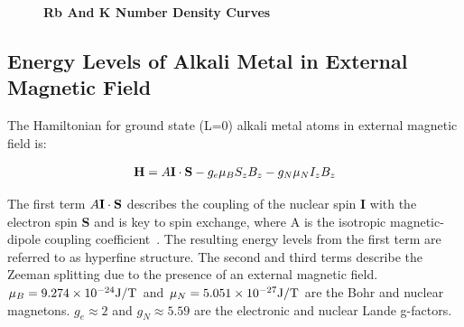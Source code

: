 \begin{figure}[t!]
	
	\centering
	\caption[Rb And K Number Density Curves]{{\bf Rb And K Number Density Curves}}
	\label{fig:AlkaliVaporDensity}
	
\end{figure}

\subsection{Energy Levels of Alkali Metal in External Magnetic Field}

The Hamiltonian for ground state (L=0) alkali metal atoms in external magnetic field is:

\begin{equation}
{\bf H} = A{\bf I \cdot S} - g_{e} \mu_{B} S_{z}B_{z} - g_{N}{\mu_{N}}I_{z}B_{z}
\end{equation}

The first term $A{\bf I \cdot S}$ describes the coupling of the nuclear spin {\bf I} with the electron spin {\bf S} and is key to spin exchange, where A is the isotropic magnetic-dipole coupling coefficient~\cite{PhysRevA.58.1412}. The resulting energy levels from the first term are referred to as hyperfine structure. The second and third terms describe the Zeeman splitting due to the presence of an external magnetic field. ${\mu}_{B} = 9.274 \times 10^{-24} {\rm J/T}$ and ${\mu}_{N} = 5.051 \times 10^{-27} {\rm J/T}$ are the Bohr and nuclear magnetons. $g_{e}\approx2$ and $g_{N}\approx5.59$ are the electronic and nuclear Lande g-factors.

